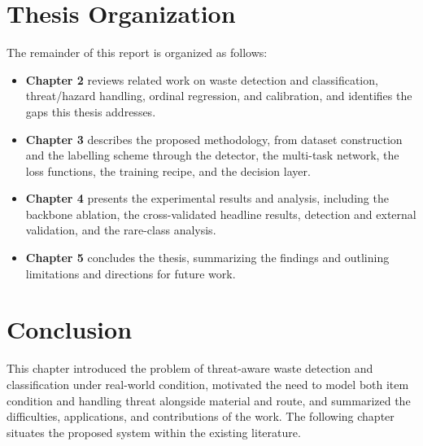 \section{Thesis Organization}
The remainder of this report is organized as follows:
\begin{itemize}
    \item \textbf{Chapter 2} reviews related work on waste detection and classification, threat/hazard handling, ordinal regression, and calibration, and identifies the gaps this thesis addresses.
    \item \textbf{Chapter 3} describes the proposed methodology, from dataset construction and the labelling scheme through the detector, the multi-task network, the loss functions, the training recipe, and the decision layer.
    \item \textbf{Chapter 4} presents the experimental results and analysis, including the backbone ablation, the cross-validated headline results, detection and external validation, and the rare-class analysis.
    \item \textbf{Chapter 5} concludes the thesis, summarizing the findings and outlining limitations and directions for future work.
\end{itemize}

\section{Conclusion}
This chapter introduced the problem of threat-aware waste detection and classification under real-world condition, motivated the need to model both item condition and handling threat alongside material and route, and summarized the difficulties, applications, and contributions of the work. The following chapter situates the proposed system within the existing literature.
